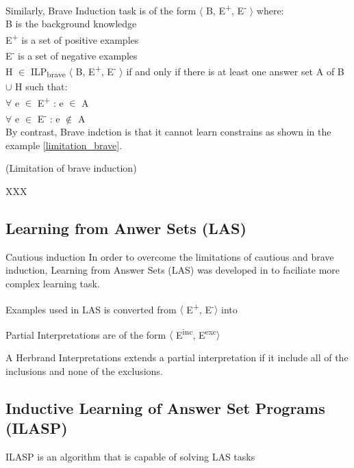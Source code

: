 \documentclass[12pt,twoside]{report}
\begin{document}
Similarly, Brave Induction task is of the form $\langle$ B, E\textsuperscript{+}, E\textsuperscript{-} $\rangle$ where: \\
B is the background knowledge \\
E\textsuperscript{+} is a set of positive examples \\
E\textsuperscript{-} is a set of negative examples \\

 H $\in$ ILP\textsubscript{brave} $\langle$ B, E\textsuperscript{+}, E\textsuperscript{-} $\rangle$ if and only if there is at least one answer set A of B $\cup$ H such that: \\
$\forall$ e $\in$ E\textsuperscript{+} : e $\in$ A \\
$\forall$ e $\in$ E\textsuperscript{-} : e $\notin$ A \\


By contrast, Brave indction is that it cannot learn constrains as shown in the example \ref{limitation_brave}.

\begin{examp} (Limitation of brave induction)

XXX
\end{examp}
\label{limitation_brave}

\subsection{Learning from Anwer Sets (LAS)}

Cautious induction In order to overcome the limitations of cautious and brave induction,
Learning from Answer Sets (LAS) was developed in \cite{Law2014} to faciliate more complex learning task.

Examples used in LAS is converted from $\langle$ E\textsuperscript{+}, E\textsuperscript{-}$\rangle$ into

Partial Interpretations are of the form $\langle$ E\textsuperscript{inc}, E\textsuperscript{exc}$\rangle$

A Herbrand Interpretations extends a partial interpretation if it include all of the inclusions and none of the exclusions.

\subsection{Inductive Learning of Answer Set Programs (ILASP)}

ILASP is an algorithm that is capable of solving LAS tasks
\end{document}
